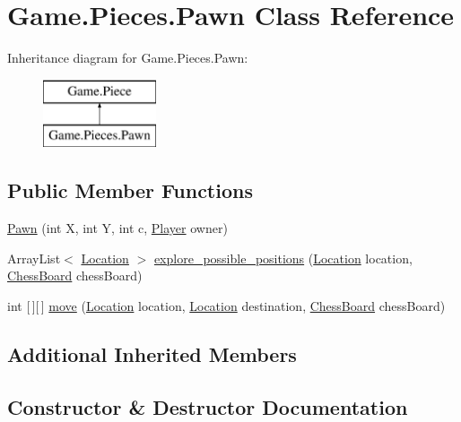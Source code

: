 \hypertarget{class_game_1_1_pieces_1_1_pawn}{}\section{Game.\+Pieces.\+Pawn Class Reference}
\label{class_game_1_1_pieces_1_1_pawn}
Inheritance diagram for Game.\+Pieces.\+Pawn\+:\begin{figure}[H]
\begin{center}
\leavevmode
\includegraphics[height=2.000000cm]{class_game_1_1_pieces_1_1_pawn}
\end{center}
\end{figure}
\subsection*{Public Member Functions}
\begin{DoxyCompactItemize}
\item 
\hyperlink{class_game_1_1_pieces_1_1_pawn_aaa1f423adede7444520459ea607f0f36}{Pawn} (int X, int Y, int c, \hyperlink{class_game_1_1_player}{Player} owner)
\item 
Array\+List$<$ \hyperlink{class_game_1_1_location}{Location} $>$ \hyperlink{class_game_1_1_pieces_1_1_pawn_ae017bf02eaa2725e81b3e090570621ce}{explore\+\_\+possible\+\_\+positions} (\hyperlink{class_game_1_1_location}{Location} location, \hyperlink{class_game_1_1_chess_board}{Chess\+Board} chess\+Board)
\item 
int \mbox{[}$\,$\mbox{]}\mbox{[}$\,$\mbox{]} \hyperlink{class_game_1_1_pieces_1_1_pawn_adf35b286f0743f944785fc916cdea79b}{move} (\hyperlink{class_game_1_1_location}{Location} location, \hyperlink{class_game_1_1_location}{Location} destination, \hyperlink{class_game_1_1_chess_board}{Chess\+Board} chess\+Board)
\end{DoxyCompactItemize}
\subsection*{Additional Inherited Members}


\subsection{Constructor \& Destructor Documentation}
\mbox{\label{class_game_1_1_pieces_1_1_pawn_aaa1f423adede7444520459ea607f0f36}} 
